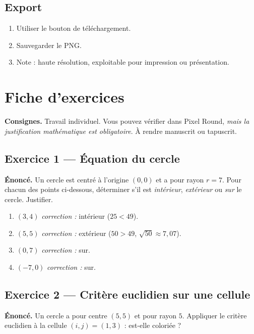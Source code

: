 \documentclass[12pt,a4paper]{scrartcl}
\begin{document}
\subsection{Export}
\begin{enumerate}[leftmargin=1.5em,itemsep=0.15em,topsep=0.3em]
  \item Utiliser le bouton de téléchargement.
  \item Sauvegarder le PNG.
  \item Note : haute résolution, exploitable pour impression ou présentation.
\end{enumerate}

\newpage
\section{Fiche d'exercices}\label{ap:exo}

\textbf{Consignes.} Travail individuel. Vous pouvez vérifier dans Pixel Round, \emph{mais la justification mathématique est obligatoire}. À rendre manuscrit ou tapuscrit.

\subsection*{Exercice 1 --- Équation du cercle}
\textbf{Énoncé.} Un cercle est centré à l'origine $(0, 0)$ et a pour rayon $r = 7$. Pour chacun des points ci-dessous, déterminer s'il est \emph{intérieur}, \emph{extérieur} ou \emph{sur} le cercle. Justifier.
\begin{enumerate}[label=\alph*),leftmargin=1.5em,itemsep=0.1em,topsep=0.2em,nosep]
  \item $(3, 4)$ \hfill \emph{correction :} intérieur ($25 < 49$).
  \item $(5, 5)$ \hfill \emph{correction :} extérieur ($50 > 49$, $\sqrt{50} \approx 7{,}07$).
  \item $(0, 7)$ \hfill \emph{correction :} sur.
  \item $(-7, 0)$ \hfill \emph{correction :} sur.
\end{enumerate}

\subsection*{Exercice 2 --- Critère euclidien sur une cellule}
\textbf{Énoncé.} Un cercle a pour centre $(5, 5)$ et pour rayon $5$. Appliquer le critère euclidien à la cellule $(i, j) = (1, 3)$ : est-elle coloriée ?
\end{document}
